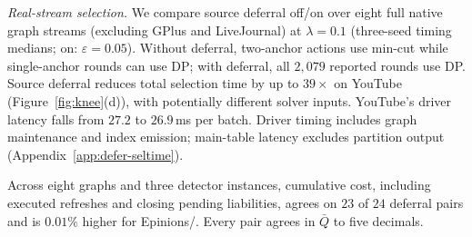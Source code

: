 \emph{Real-stream selection.}
We compare source deferral off/on over eight full native graph streams
(excluding GPlus and LiveJournal) at $\lambda=0.1$
(three-seed timing medians; on: $\varepsilon=0.05$).
Without deferral, two-anchor actions use min-cut while single-anchor rounds
can use DP; with deferral, all $2{,}079$ reported rounds use DP.
Source deferral reduces total selection time by up to $39\times$ on YouTube
(Figure~\ref{fig:knee}(d)), with potentially different solver inputs.
YouTube's driver latency falls from $27.2$ to $26.9$\,ms per batch.
Driver timing includes graph maintenance and index emission; main-table
latency excludes partition output (Appendix~\ref{app:defer-seltime}).

Across eight graphs and three detector instances, cumulative cost, including
executed refreshes and closing pending liabilities, agrees on $23$ of $24$
deferral pairs and is $0.01\%$ higher for Epinions/\Louvain{}. Every pair
agrees in $\bar Q$ to five decimals.
